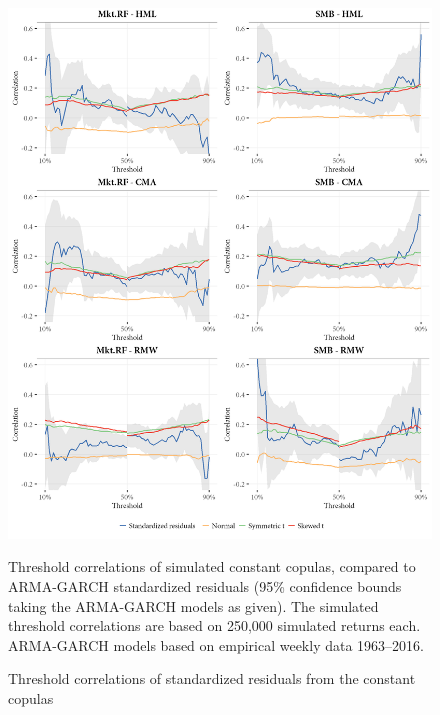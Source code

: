 \begin{figure}[p]
  \centering
  \includegraphics[scale=1]{graphics/threshold_simulated_1.png}  
  \footnotesize
  \caption{Threshold correlations of standardized residuals from the constant copulas}

  \begin{longcaption}
    Threshold correlations of simulated constant copulas, compared to ARMA-GARCH standardized residuals (95\% confidence bounds taking the ARMA-GARCH models as given). The simulated threshold correlations are based on 250,000 simulated returns each. ARMA-GARCH models based on empirical weekly data 1963--2016.
  \end{longcaption}
  \label{fig:threshold_simulated1}
\end{figure}

